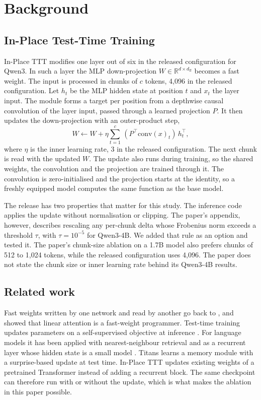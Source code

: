 \documentclass{article}
\begin{document}
\section{Background}

\subsection{In-Place Test-Time Training}

In-Place TTT \citep{feng2026inplace} modifies one layer out of six in the released configuration for Qwen3. In such a layer the MLP down-projection $W \in \mathbb{R}^{d \times d_{\mathrm{ff}}}$ becomes a fast weight. The input is processed in chunks of $c$ tokens, 4,096 in the released configuration. Let $h_t$ be the MLP hidden state at position $t$ and $x_t$ the layer input. The module forms a target per position from a depthwise causal convolution of the layer input, passed through a learned projection $P$. It then updates the down-projection with an outer-product step,
\begin{equation}
W \leftarrow W + \eta \sum_{t=1}^{c} \, (P^{\top} \mathrm{conv}(x)_t)\, h_t^{\top},
\end{equation}
where $\eta$ is the inner learning rate, 3 in the released configuration. The next chunk is read with the updated $W$. The update also runs during training, so the shared weights, the convolution and the projection are trained through it. The convolution is zero-initialised and the projection starts at the identity, so a freshly equipped model computes the same function as the base model.

The release has two properties that matter for this study. The inference code applies the update without normalisation or clipping. The paper's appendix, however, describes rescaling any per-chunk delta whose Frobenius norm exceeds a threshold $\tau$, with $\tau = 10^{-5}$ for Qwen3-4B. We added that rule as an option and tested it. The paper's chunk-size ablation on a 1.7B model also prefers chunks of 512 to 1,024 tokens, while the released configuration uses 4,096. The paper does not state the chunk size or inner learning rate behind its Qwen3-4B results.

\subsection{Related work}

Fast weights written by one network and read by another go back to \citet{ba2016fast}, and \citet{schlag2021linear} showed that linear attention is a fast-weight programmer. Test-time training updates parameters on a self-supervised objective at inference \citep{sun2020ttt}. For language models it has been applied with nearest-neighbour retrieval \citep{hardt2023nearest} and as a recurrent layer whose hidden state is a small model \citep{sun2024ttt}. Titans \citep{behrouz2025titans} learns a memory module with a surprise-based update at test time. In-Place TTT updates existing weights of a pretrained Transformer instead of adding a recurrent block. The same checkpoint can therefore run with or without the update, which is what makes the ablation in this paper possible.
\end{document}
